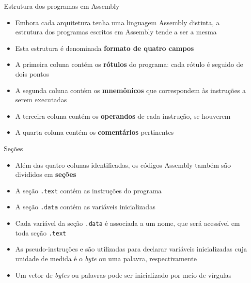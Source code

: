 \begin{frame}[fragile]{Estrutura dos programas em Assembly}

    \begin{itemize}
        \item Embora cada arquitetura tenha uma linguagem Assembly distinta, a estrutura dos 
            programas escritos em Assembly tende a ser a mesma

        \item Esta estrutura é denominada \textbf{formato de quatro campos}


        \item A primeira coluna contém os \textbf{rótulos} do programa: cada rótulo é seguido de 
            dois pontos

        \item A segunda coluna contém os \textbf{mnemônicos} que correspondem às instruções a serem
            executadas

        \item A terceira coluna contém os \textbf{operandos} de cada instrução, se houverem

        \item A quarta coluna contém os \textbf{comentários} pertinentes
    \end{itemize}

\end{frame}

\begin{frame}[fragile]{Seções}

    \begin{itemize}
        \item Além das quatro colunas identificadas, os códigos Assembly também são divididos
            em \textbf{seções}

        \item A seção \texttt{.text} contém as instruções do programa

        \item A seção \texttt{.data} contém as variáveis inicializadas

        \item Cada variável da seção \texttt{.data} é associada a um nome, que será
            acessível em toda seção \texttt{.text}

        \item As pseudo-instruções  e  são utilizadas para declarar
            variáveis inicializadas cuja unidade de medida é o \textit{byte} ou uma palavra,
            respectivamente

        \item Um vetor de \textit{bytes} ou palavras pode ser inicializado por meio de 
            vírgulas

    \end{itemize}

\end{frame}

